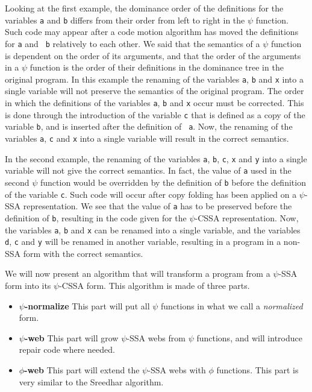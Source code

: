 
Looking at the first example, the dominance order of the definitions
for the variables {\tt a} and {\tt b} differs from their order from
left to right in the $\psi$ function. Such code may appear after a
code motion algorithm has moved the definitions for {\tt a} and {\tt
b} relatively to each other. We said that the semantics of a
$\psi$ function is dependent on the order of its arguments, and that
the order of the arguments in a $\psi$ function is the order of their
definitions in the dominance tree in the original program. In this
example the renaming of the variables {\tt a}, {\tt b} and {\tt x}
into a single variable will not preserve the semantics of the original
program. The order in which the definitions of the variables {\tt a},
{\tt b} and {\tt x} occur must be corrected. This is done through the
introduction of the variable {\tt c} that is defined as a copy of the
variable {\tt b}, and is inserted after the definition of {\tt
a}. Now, the renaming of the variables {\tt a}, {\tt c} and {\tt x}
into a single variable will result in the correct semantics.

In the second example, the renaming of the variables {\tt a}, {\tt b},
{\tt c}, {\tt x} and {\tt y} into a single variable will not give the
correct semantics. In fact, the value of {\tt a} used in the second
$\psi$ function would be overridden by the definition of {\tt b}
before the definition of the variable {\tt c}. Such code will occur
after copy folding has been applied on a $\psi$-SSA representation. We
see that the value of {\tt a} has to be preserved before the
definition of {\tt b}, resulting in the code given for the $\psi$-CSSA
representation. Now, the variables {\tt a}, {\tt b} and {\tt x} can be
renamed into a single variable, and the variables {\tt d}, {\tt c} and
{\tt y} will be renamed in another variable, resulting in a program in
a non-SSA form with the correct semantics.

We will now present an algorithm that will transform a program from a
$\psi$-SSA form into its $\psi$-CSSA form. This algorithm is made of
three parts.

\begin{itemize}
\item {\bf $\psi$-normalize} This part will put all $\psi$ functions
in what we call a {\em normalized} form.
\item {\bf $\psi$-web} This part will grow $\psi$-SSA webs from $\psi$
  functions, and will introduce repair code where needed.
\item {\bf $\phi$-web} This part will extend the $\psi$-SSA webs with
  $\phi$ functions. This part is very similar to the Sreedhar
  algorithm.
\end{itemize}

